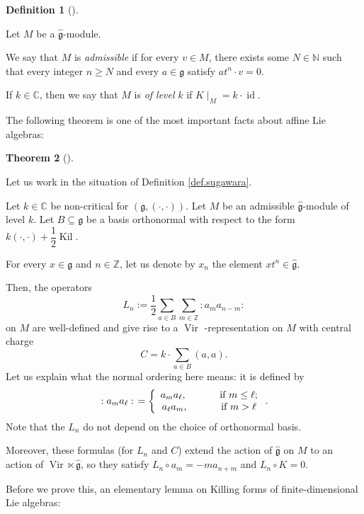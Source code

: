 \documentclass
[numbers=enddot,12pt,final,onecolumn,german,notitlepage]{scrartcl}%
\theoremstyle{definition}
\newtheorem{theo}{Theorem}
\newenvironment{theorem}[1][]
{\begin{theo}[#1]\begin{leftbar}}
{\end{leftbar}\end{theo}}
\newtheorem{defi}[theo]{Definition}
\newenvironment{definition}[1][]
{\begin{defi}[#1]\begin{leftbar}}
{\end{leftbar}\end{defi}}
\begin{document}
\begin{definition}
\label{def.sugawara.M}Let $M$ be a $\widehat{\mathfrak{g}}$-module.

We say that $M$ is \textit{admissible} if for every $v\in M$, there exists
some $N\in\mathbb{N}$ such that every integer $n\geq N$ and every
$a\in\mathfrak{g}$ satisfy $at^{n}\cdot v=0$.

If $k\in\mathbb{C}$, then we say that $M$ is \textit{of level }$k$ if
$K\mid_{M}=k\cdot\operatorname*{id}$.
\end{definition}

The following theorem is one of the most important facts about affine Lie algebras:

\begin{theorem}
[Sugawara construction]\label{thm.sugawara}Let us work in the situation of
Definition \ref{def.sugawara}.

Let $k\in\mathbb{C}$ be non-critical for $\left(  \mathfrak{g},\left(
\cdot,\cdot\right)  \right)  $. Let $M$ be an admissible
$\widehat{\mathfrak{g}}$-module of level $k$. Let $B\subseteq\mathfrak{g}$ be
a basis orthonormal with respect to the form $k\left(  \cdot,\cdot\right)
+\dfrac{1}{2}\operatorname*{Kil}$.

For every $x\in\mathfrak{g}$ and $n\in\mathbb{Z}$, let us denote by $x_{n}$
the element $xt^{n}\in\widehat{\mathfrak{g}}$.

Then, the operators%
\[
L_{n}:=\dfrac{1}{2}\sum\limits_{a\in B}\sum\limits_{m\in\mathbb{Z}}\left.
:a_{m}a_{n-m}:\right.
\]
on $M$ are well-defined and give rise to a $\operatorname*{Vir}$%
-representation on $M$ with central charge%
\[
C=k\cdot\sum\limits_{a\in B}\left(  a,a\right)  .
\]
Let us explain what the normal ordering here means: it is defined by%
\[
\left.  :a_{m}a_{\ell}:\right.  =\left\{
\begin{array}
[c]{c}%
a_{m}a_{\ell},\ \ \ \ \ \ \ \ \ \ \text{if }m\leq\ell;\\
a_{\ell}a_{m},\ \ \ \ \ \ \ \ \ \ \text{if }m>\ell
\end{array}
\right.  .
\]
Note that the $L_{n}$ do not depend on the choice of orthonormal basis.

Moreover, these formulas (for $L_{n}$ and $C$) extend the action of
$\widehat{\mathfrak{g}}$ on $M$ to an action of $\operatorname*{Vir}%
\ltimes\widehat{\mathfrak{g}}$, so they satisfy $L_{n}\circ a_{m}=-ma_{n+m}$
and $L_{n}\circ K=0$.
\end{theorem}

Before we prove this, an elementary lemma on Killing forms of
finite-dimensional Lie algebras:
\end{document}
